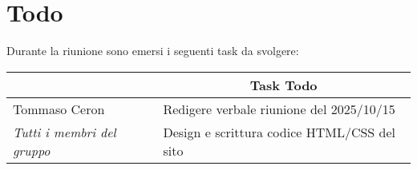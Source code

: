 \section{Todo}

Durante la riunione sono emersi i seguenti task da svolgere:

\vspace{0.5cm}

\begin{table}[htbp]
\begin{tabular}{|p{}|p{}|}
    \hline
    \rowcolor[gray]{0.9}
    \multicolumn{1}{|c|}{\textbf{Assegnatario}} & \multicolumn{1}{|c|}{\textbf{Task Todo}} \\
    \hline
    Tommaso Ceron & Redigere verbale riunione del {2025/10/15} \\
    \hline
    \it{Tutti i membri del gruppo} & Design e scrittura codice HTML/CSS del sito\\
    \hline
\end{tabular}
\end{table}
